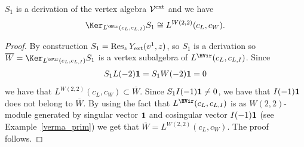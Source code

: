 \begin{Theorem}
$S_1$ is a derivation of the vertex algebra $\mathcal V^{\rm ext}$ and we have
\begin{gather*}
\Ker_{ L^{\HVir} (c_L,c_{L,I}) } S_1 \cong L ^{W(2,2)} (c_L, c_W ).
\end{gather*}
\end{Theorem}
\begin{proof}
By construction $S_1 = \operatorname{Res}_z Y_{\rm ext} (v^1, z)$, so $S_1$ is a derivation so $\overline W = \Ker_{ L^{\HVir} (c_L,c_{L,I}) } S_1$ is a vertex subalgebra of $L^{\HVir} (c_L,c_{L,I})$. Since
\begin{gather*}
S_1 L(-2) {\bf 1} = S_1 W(-2) {\bf 1} = 0
\end{gather*}
we have that $L ^{W(2,2)} (c_L, c_W ) \subset \overline W$. Since $S_1 I (-1) {\bf 1} \ne 0$, we have that $I(-1) {\bf 1}$ does not belong to $\overline W$. By using the fact that $L^{\HVir} (c_L,c_{L,I})$ is as $W(2,2)$-module generated by singular vector $\bf{1}$ and cosingular vector $I(-1) {\bf 1}$ (see Example~\ref{verma_prim}) we get that $\overline W = L ^{W(2,2)} (c_L, c_W )$. The proof follows.
\end{proof}
